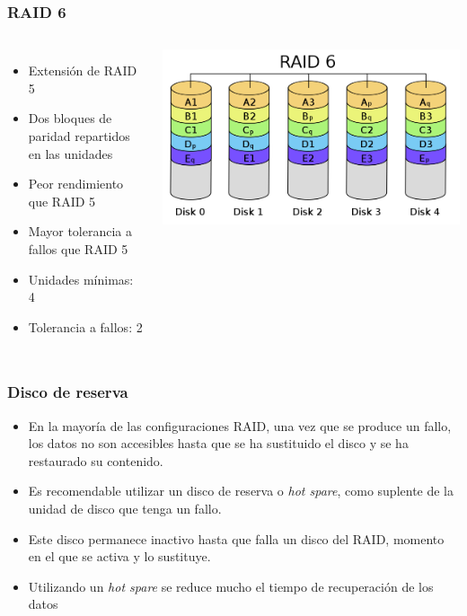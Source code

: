 \documentclass[aspectratio=169]{beamer}
\begin{document}
\begin{frame}
  \frametitle{RAID 6}
  \begin{columns}
    \begin{itemize}
    \item Extensión de RAID 5
    \item Dos bloques de paridad repartidos en las unidades
    \item Peor rendimiento que RAID 5
    \item Mayor tolerancia a fallos que RAID 5
    \item Unidades mínimas: 4
    \item Tolerancia a fallos: 2
    \end{itemize}
    \includegraphics[width=\textwidth]{img/RAID6}
  \end{columns}
  
\end{frame}

\begin{frame}
  \frametitle{Disco de reserva}
  \begin{itemize}
  \item En la mayoría de las configuraciones RAID, una vez que se
    produce un fallo, los datos no son accesibles hasta que se ha
    sustituido el disco y se ha restaurado su contenido.
  \item Es recomendable utilizar un disco de reserva o \emph{hot
      spare}, como suplente de la unidad de disco que tenga un fallo.
  \item Este disco permanece inactivo hasta que falla un disco del
    RAID, momento en el que se activa y lo sustituye.
  \item Utilizando un \emph{hot spare} se reduce mucho el tiempo de
    recuperación de los datos
  \end{itemize}
\end{frame}
\end{document}
